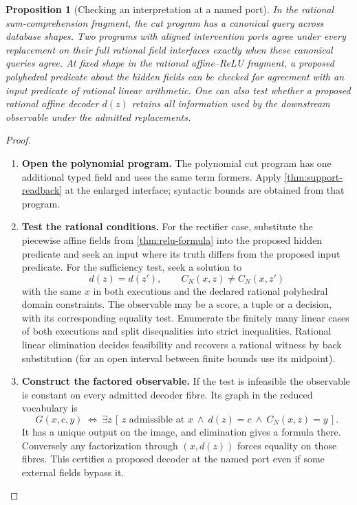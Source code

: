 \documentclass[11pt,a4paper]{article}
\newtheorem{proposition}[proposition]{Proposition}
\theoremstyle{definition}
\theoremstyle{remark}\newaliascnt{remark}{theorem}
\numberwithin{equation}{section}
\begin{document}
\begin{proposition}[Checking an interpretation at a named port]\label{prop:port-interpretation}
In the rational sum-comprehension fragment, the cut program has a canonical query across database shapes. Two programs with aligned intervention ports agree under every replacement on their full rational field interfaces exactly when these canonical queries agree. At fixed shape in the rational affine--ReLU fragment, a proposed polyhedral predicate about the hidden fields can be checked for agreement with an input predicate of rational linear arithmetic. One can also test whether a proposed rational affine decoder $d(z)$ retains all information used by the downstream observable under the admitted replacements.
\end{proposition}
\begin{proof}\leavevmode
\begin{enumerate}[titledsteps]
    \item \textbf{Open the polynomial program.} The polynomial cut program has one additional typed field and uses the same term formers. Apply \cref{thm:support-readback} at the enlarged interface; syntactic bounds are obtained from that program. 
    \item \textbf{Test the rational conditions.} For the rectifier case, substitute the piecewise affine fields from \cref{thm:relu-formula} into the proposed hidden predicate and seek an input where its truth differs from the proposed input predicate. For the sufficiency test, seek a solution to
\[
      d(z)=d(z'),\qquad C_N(x,z)\ne C_N(x,z')
\]
with the same $x$ in both executions and the declared rational polyhedral domain constraints. The observable may be a score, a tuple or a decision, with its corresponding equality test. Enumerate the finitely many linear cases of both executions and split disequalities into strict inequalities. Rational linear elimination decides feasibility and recovers a rational witness by back substitution (for an open interval between finite bounds use its midpoint). 
    \item \textbf{Construct the factored observable.} If the test is infeasible the observable is constant on every admitted decoder fibre. Its graph in the reduced vocabulary is
\[
       G(x,c,y)\ \Longleftrightarrow\
       \exists z\,[\,z\text{ admissible at }x\ \wedge\
                         d(z)=c\ \wedge\ C_N(x,z)=y\,].
\]
It has a unique output on the image, and elimination gives a formula there. Conversely any factorization through $(x,d(z))$ forces equality on those fibres. This certifies a proposed decoder at the named port even if some external fields bypass it.\qedhere
\end{enumerate}
\end{proof}
\end{document}
